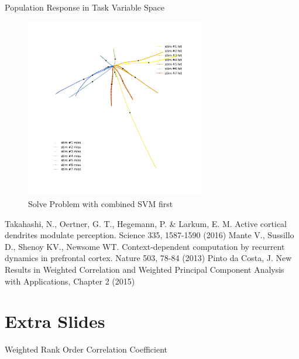 \documentclass[10pt]{beamer}
\begin{document}
\begin{frame}[fragile]{Population Response in Task Variable Space}
\begin{center}
	\begin{figure}
	\caption*{Solve Problem with combined SVM first}
      \includegraphics[width=0.7\textwidth]{reg_sum.png}
	\end{figure}
	\end{center}
\end{frame}

\begin{frame}
\begin{thebibliography}{9}
 Takahashi, N., Oertner, G. T., Hegemann, P. \& Larkum, E. M. Active cortical dendrites modulate perception. Science 335, 1587-1590 (2016)
 Mante V., Sussillo D., Shenoy KV., Newsome WT. Context-dependent computation by recurrent dynamics in prefrontal cortex. Nature 503, 78-84 (2013)
 Pinto da Costa, J. New Results in Weighted Correlation and Weighted Principal Component Analysis with Applications, Chapter 2 (2015)
\end{thebibliography}
\end{frame}

\section*{Extra Slides}
\begin{frame}[fragile]{Weighted Rank Order Correlation Coefficient}


\end{frame}
\end{document}
